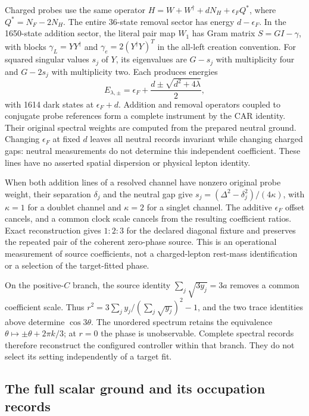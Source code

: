 Charged probes use the same operator
$H=W+W^\dagger+dN_H+\epsilon_F Q^*$, where
$Q^*=N_F-2N_H$. The entire 36-state removal sector has energy
$d-\epsilon_F$. In the 1650-state addition sector, the literal pair
map $W_1$ has Gram matrix $S=GI-\gamma$, with blocks
$\gamma_L=YY^\dagger$ and
$\gamma_e=2(Y^\dagger Y)^T$ in the all-left creation convention.
For squared singular values $s_j$ of $Y$, its eigenvalues are
$G-s_j$ with multiplicity four and $G-2s_j$ with multiplicity two.
Each produces energies
\[
 E_{\lambda,\pm}=\epsilon_F+
       \frac{d\pm\sqrt{d^2+4\lambda}}2,
\]
with 1614 dark states at $\epsilon_F+d$. Addition and removal operators
coupled to conjugate probe references form a complete instrument by the
CAR identity. Their original spectral weights are computed from the
prepared neutral ground. Changing $\epsilon_F$ at fixed $d$ leaves
all neutral records invariant while changing charged gaps: neutral
measurements do not determine this independent coefficient. These lines
have no asserted spatial dispersion or physical lepton identity.

When both addition lines of a resolved channel have nonzero original
probe weight, their separation $\delta_j$ and the neutral gap give
$s_j=(\Delta^2-\delta_j^2)/(4\kappa)$, with $\kappa=1$ for a
doublet channel and $\kappa=2$ for a singlet channel. The additive
$\epsilon_F$ offset cancels, and a common clock scale cancels from
the resulting coefficient ratios. Exact reconstruction gives $1:2:3$
for the declared diagonal fixture and preserves the repeated pair of
the coherent zero-phase source. This is an operational measurement of
source coefficients, not a charged-lepton rest-mass identification or
a selection of the target-fitted phase.

On the positive-$C$ branch, the source identity
$\sum_j\sqrt{3y_j}=3a$ removes a common coefficient scale. Thus
$r^2=3\sum_j y_j/(\sum_j\sqrt{y_j})^2-1$, and the two trace
identities above determine $\cos3\theta$. The unordered spectrum
retains the equivalence $\theta\mapsto\pm\theta+2\pi k/3$;
at $r=0$ the phase is unobservable. Complete spectral records therefore
reconstruct the configured controller within that branch. They do not
select its setting independently of a target fit.

\subsection{The full scalar ground and its occupation records}

